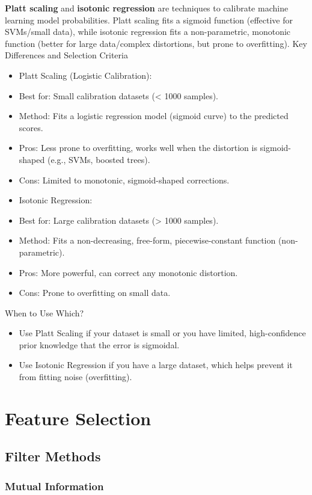 \documentclass[10pt,a4paper]{article}
\begin{document}
	\textbf{Platt scaling} and \textbf{isotonic regression} are techniques to calibrate machine learning model probabilities. Platt scaling fits a sigmoid function (effective for SVMs/small data), while isotonic regression fits a non-parametric, monotonic function (better for large data/complex distortions, but prone to overfitting).
	Key Differences and Selection Criteria
	\begin{itemize}
		\item Platt Scaling (Logistic Calibration):
		\item Best for: Small calibration datasets (< 1000 samples).
		\item Method: Fits a logistic regression model (sigmoid curve) to the predicted scores.
		\item Pros: Less prone to overfitting, works well when the distortion is sigmoid-shaped (e.g., SVMs, boosted trees).
		\item Cons: Limited to monotonic, sigmoid-shaped corrections.
		\item Isotonic Regression:
		\item Best for: Large calibration datasets (> 1000 samples).
		\item Method: Fits a non-decreasing, free-form, piecewise-constant function (non-parametric).
		\item Pros: More powerful, can correct any monotonic distortion.
		\item Cons: Prone to overfitting on small data.
	\end{itemize}

	When to Use Which?
	\begin{itemize}
		\item Use Platt Scaling if your dataset is small or you have limited, high-confidence prior knowledge that the error is sigmoidal.
		\item Use Isotonic Regression if you have a large dataset, which helps prevent it from fitting noise (overfitting).
	\end{itemize}



	\section{Feature Selection}
	\subsection{Filter Methods}
	\subsubsection{Mutual Information}
\end{document}
